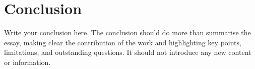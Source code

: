 \documentclass{scrartcl}
\begin{document}




\section{Conclusion}

Write your conclusion here. The conclusion should do more than summarise the essay, making clear the contribution of the work and highlighting key points, limitations, and outstanding questions. It should not introduce any new content or information.



\end{document}
